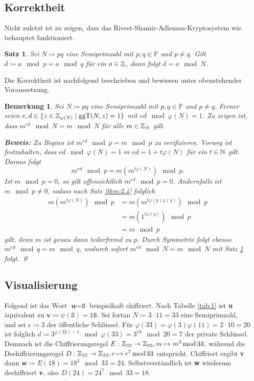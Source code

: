 \documentclass{paper}
\theoremstyle{classic}
\newtheorem{remark}[definition]{Bemerkung}
\newtheorem{theorem}[definition]{Satz}
\begin{document}
\subsection{Korrektheit}

Nicht zuletzt ist zu zeigen, dass das Rivest-Shamir-Adleman-Kryptosystem wie behauptet funktioniert.
\begin{theorem}
\label{thm:3.2}
Sei \(N \coloneqq pq\) eine Semiprimzahl mit \(p,q \in \mathbb{P}\) und \(p \neq q\). Gilt \(d \coloneqq a \mod p = a \mod q\) für ein \(a \in \mathbb{Z}\), dann folgt \(d = a \mod N\).
\end{theorem}
Die Korrektheit ist nachfolgend beschrieben und bewiesen unter obenstehender Voraussetzung.
\begin{remark}
\label{rem:3.3}
Sei \(N \coloneqq pq\) eine Semiprimzahl mit \(p,q \in \mathbb{P}\) und \(p \neq q\). Ferner seien \(e,d \in \{z \in \mathbb{Z}_{\varphi(N)} \mid \operatorname{ggT}(N,z) = 1\}\) mit \(ed \mod \varphi(N) = 1\). Zu zeigen ist, dass \(m^{ed} \mod N = m \mod N\) für alle \(m \in \mathbb{Z}_N\) gilt.

\textbf{Beweis:} Zu Beginn ist \(m^{ed} \mod p = m \mod p\) zu verifizieren. Vorweg ist festzuhalten, dass \(ed \mod \varphi(N) = 1 \Leftrightarrow ed = 1 + t\varphi(N)\) für ein \(t \in \mathbb{N}\) gilt. Daraus folgt
\[
m^{ed} \mod p = m \left( m^{t\varphi(N)} \right) \mod p.
\]
Ist \(m \mod p = 0\), so gilt offensichtlich \(m^{ed} \mod p = 0\). Andernfalls ist \(m \mod p \neq 0\), sodass nach Satz \ref{thm:2.4} folglich
\begin{align*}
m \left( m^{t\varphi(N)} \right) \mod p &= m \left( m^{t\varphi(p)\varphi(q)} \right) \mod p \\
&= m \left( 1^{t\varphi(q)} \right) \mod p \\
&= m \mod p
\end{align*}
gilt, denn \(m\) ist genau dann teilerfremd zu \(p\). Durch Symmetrie folgt ebenso \(m^{ed} \mod q = m \mod q\), wodurch sofort \(m^{ed} \mod N = m \mod N\) mit Satz \ref{thm:3.2} folgt. \qed
\end{remark}

\subsection{Visualisierung}

Folgend ist das Wort \(\textbf{u} \coloneqq \texttt{S}\) beispielhaft chiffriert. Nach Tabelle \ref{tab:1} ist \textbf{u} äquivalent zu \(\textbf{v} \coloneqq \psi(\texttt{S}) = \texttt{18}\). Sei fortan \(N \coloneqq 3 \cdot 11 = 33\) eine Semiprimzahl, und sei \(e \coloneqq 3\) der öffentliche Schlüssel. Für \(\varphi(33) = \varphi(3) \varphi(11) = 2 \cdot 10 = 20\) ist folglich \(d \coloneqq 3^{\varphi(33) - 1} \mod \varphi(33) = 3^{19} \mod 20 = 7\) der private Schlüssel. Demnach ist die Chiffrierungsregel \(E : \mathbb{Z}_{33} \rightarrow \mathbb{Z}_{33}, m \mapsto m^3 \operatorname{mod} 33\), während die Dechiffrierungsregel \(D : \mathbb{Z}_{33} \rightarrow \mathbb{Z}_{33}, c \mapsto c^7 \operatorname{mod} 33\) entspricht. Chiffriert ergibt \textbf{v} dann \(\textbf{w} \coloneqq E(18) = 18^3 \mod 33 = 24\). Selbstverständlich ist \textbf{w} wiederum dechiffriert \textbf{v}, also \(D(24) = 24^7 \mod 33 = 18\).
\end{document}
